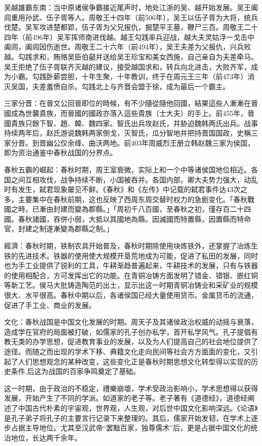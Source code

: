 吴越雄霸东南：当中原诸侯争霸接近尾声时，地处江浙的吴、越开始发展。吴王阖闾重用孙武、伍子胥等人。周敬王十四年（前506年），吴王以伍子胥为大将，统兵伐楚。吴军攻进楚都郢，伍子胥为父兄报仇，掘楚平王墓，鞭尸三百。周敬王二十四年（前496年）吴军挥师南进伐越。越王勾践率兵迎战，越大夫灵姑浮一戈击中阖闾，阖闾因伤逝世。周敬王二十六年（前494年），吴王夫差为父报仇，兴兵败越。勾践求和，贿赂吴臣伯嚭并送给吴王珍宝和美女西施，自己亲自为夫差牵马。吴王拒绝了伍子胥联齐灭越的建议，接受越国求和，转兵向北进击，大败齐军，成为小霸。勾践卧薪尝胆，十年生聚，十年教训，终于在周元王三年（前473年）消灭吴国，夫差羞愤自杀。勾践北上与齐晋会盟于徐，成为最后一个霸主。

三家分晋：在晉文公回晉即位的時候，有不少隨從隨他回國，結果這些人漸漸在晉國成為世襲貴族，而晉國的國政亦落入這些貴族（士大夫）的手上。前455年，晉國貴族只餘下智、趙、韓、魏四家。智氏出兵攻赵氏，并胁迫魏韩两氏出兵。战事持续两年后，赵氏游说魏韩两家倒戈，灭智氏，瓜分智地并把持晋国国政，史稱三家分晋。到晋幽公仅余绛、曲沃两地。前403年周威烈王册立韩赵魏三家为侯国，即为资治通鉴中春秋战国的分界点。

春秋五霸的崛起：春秋时期，周王室衰微，实际上和一个中等诸侯国地位相近。各国之间互相攻伐，战争持续不断，小国被吞并。各国内部，卿大夫势力强大，动乱时有发生，弑君现象屡见不鲜。《春秋》和《左传》中记载的弑君事件达43次之多，主要集中在春秋前期，这也反映了西周东周交替时权力的急剧变化。「春秋戰國之時，已漸由封建而變為郡縣。」「周初千八百國，至春秋之初，僅存百二十四國。春秋諸國，吞併小弱，大抵以其國地為縣。因滅國而特置縣，因置縣而特命官，封建之制遂漸變為郡縣之制。」

經濟：春秋时期，铁制农具开始普及，春秋时期除使用块炼铁外，还掌握了冶炼生铁的先进技术。铁器的使用使大规模开垦荒地成为可能，促进了私田的发展，同时也为手工业提供了锐利的工具，牛耕渐趋普遍起来，牛耕技术的发展，只有与铁器的使用相配合，方可发挥出它的功能。在青铜冶铸方面发明了错金、错银、嵌红铜等新工艺。侯马大批铸造陶范的出土，显示出这一时期青铜冶铸业和采矿业的规模很大、水平很高。春秋中期以后，各诸侯国已经大量使用货币。金属货币的流通，促进了手工业、商业的发展。

文化：春秋战国是中国文化发展的时期。周天子及其诸侯政治权威的动摇与衰落，造成学在官府的局面被打破，如儒家的孔子创办私学，首开私学风气。孔子提倡有教无类的办学思想，促进教育事业的发展，以及为人们提高自己的社会地位提供了途径。而随之而出现的学术下移、典籍文化走向民间等社会方方面面的变化，又引起了人们思想观念的某种改变，这些变化正是春秋时期思想文化转型得以实现的历史条件,后这为战国的百家争鸣奠定了基础。

这一时期，由于政治的不稳定，禮樂崩壞，学术受政治影响小，学术思想得以获得发展，开始产生了不同的学派。如道家的老子等。老子著有《道德经》，道德经阐述了中国古代朴素的宇宙观，世界观，人生观，对后世中国文化影响深远。《论语》是孔子弟子将孔子的主要言行记录下来整理的。其后，儒家开始发韧，在学术上逐步占据主导地位。尤其至汉武帝“罢黜百家，独尊儒术”后，更是占据中国文化的统治地位，长达两千余年。

